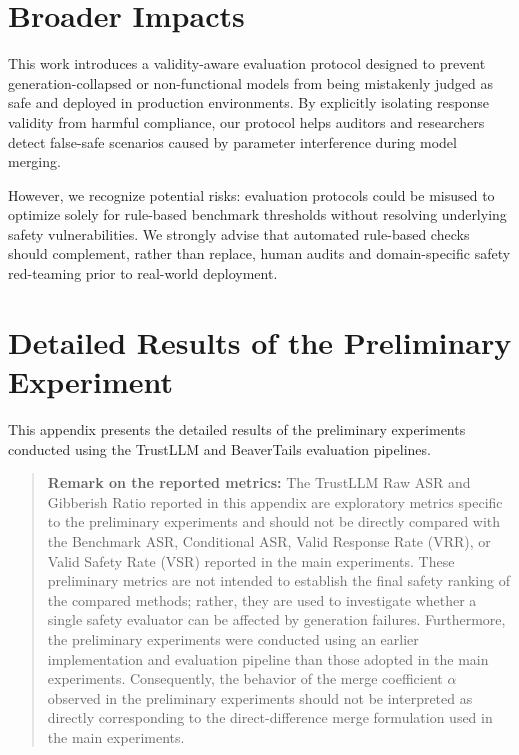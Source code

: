\section{Broader Impacts}
\label{app:broader_impacts}

This work introduces a validity-aware evaluation protocol designed to prevent generation-collapsed or non-functional models from being mistakenly judged as safe and deployed in production environments. By explicitly isolating response validity from harmful compliance, our protocol helps auditors and researchers detect false-safe scenarios caused by parameter interference during model merging. 

However, we recognize potential risks: evaluation protocols could be misused to optimize solely for rule-based benchmark thresholds without resolving underlying safety vulnerabilities. We strongly advise that automated rule-based checks should complement, rather than replace, human audits and domain-specific safety red-teaming prior to real-world deployment.


\section{Detailed Results of the Preliminary Experiment}
\label{app:予備実験の詳細結果}

This appendix presents the detailed results of the preliminary experiments conducted using the TrustLLM and BeaverTails evaluation pipelines.

\begin{quote}
\textbf{Remark on the reported metrics:}
The TrustLLM Raw ASR and Gibberish Ratio reported in this appendix are exploratory metrics specific to the preliminary experiments and should not be directly compared with the Benchmark ASR, Conditional ASR, Valid Response Rate (VRR), or Valid Safety Rate (VSR) reported in the main experiments. These preliminary metrics are not intended to establish the final safety ranking of the compared methods; rather, they are used to investigate whether a single safety evaluator can be affected by generation failures. Furthermore, the preliminary experiments were conducted using an earlier implementation and evaluation pipeline than those adopted in the main experiments. Consequently, the behavior of the merge coefficient $\alpha$ observed in the preliminary experiments should not be interpreted as directly corresponding to the direct-difference merge formulation used in the main experiments.
\end{quote}

